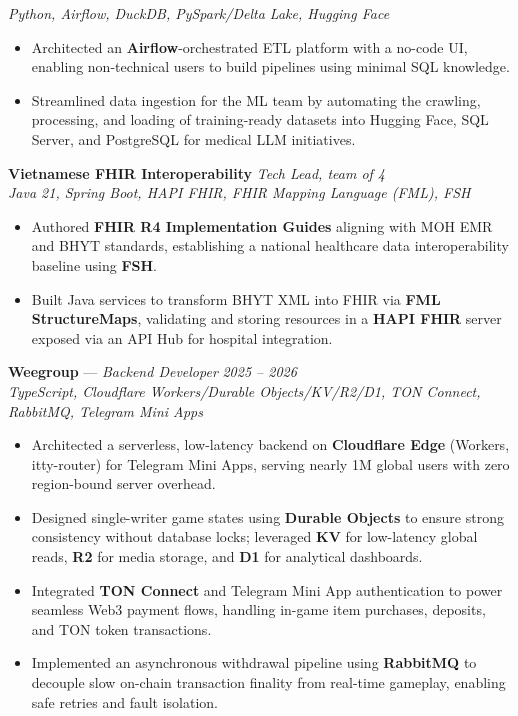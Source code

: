 \documentclass[9pt,a4paper]{extarticle}
\begin{document}
\textit{Python, Airflow, DuckDB, PySpark/Delta Lake, Hugging Face}
\begin{itemize}
\item Architected an \textbf{Airflow}-orchestrated ETL platform with a no-code UI, enabling non-technical users to build pipelines using minimal SQL knowledge.
    \item Streamlined data ingestion for the ML team by automating the crawling, processing, and loading of training-ready datasets into Hugging Face, SQL Server, and PostgreSQL for medical LLM initiatives.
\end{itemize}
     \smallskip
\noindent\textbf{Vietnamese FHIR Interoperability} \hfill \textit{Tech Lead, team of 4}\\
\textit{Java 21, Spring Boot, HAPI FHIR, FHIR Mapping Language (FML), FSH}
\begin{itemize}
    \item Authored \textbf{FHIR R4 Implementation Guides} aligning with MOH EMR and BHYT standards, establishing a national healthcare data interoperability baseline using \textbf{FSH}.
    \item Built Java services to transform BHYT XML into FHIR via \textbf{FML StructureMaps}, validating and storing resources in a \textbf{HAPI FHIR} server exposed via an API Hub for hospital integration.
\end{itemize}
\noindent\textbf{Weegroup} --- \textit{Backend Developer} \hfill \textit{2025 -- 2026}\\
\textit{TypeScript, Cloudflare Workers/Durable Objects/KV/R2/D1, TON Connect, RabbitMQ, Telegram Mini Apps}
\begin{itemize}
    \item Architected a serverless, low-latency backend on \textbf{Cloudflare Edge} (Workers, itty-router) for Telegram Mini Apps, serving nearly 1M global users with zero region-bound server overhead.
    \item Designed single-writer game states using \textbf{Durable Objects} to ensure strong consistency without database locks; leveraged \textbf{KV} for low-latency global reads, \textbf{R2} for media storage, and \textbf{D1} for analytical dashboards.
    \item Integrated \textbf{TON Connect} and Telegram Mini App authentication to power seamless Web3 payment flows, handling in-game item purchases, deposits, and TON token transactions.
    \item Implemented an asynchronous withdrawal pipeline using \textbf{RabbitMQ} to decouple slow on-chain transaction finality from real-time gameplay, enabling safe retries and fault isolation.
\end{itemize}
\end{document}
